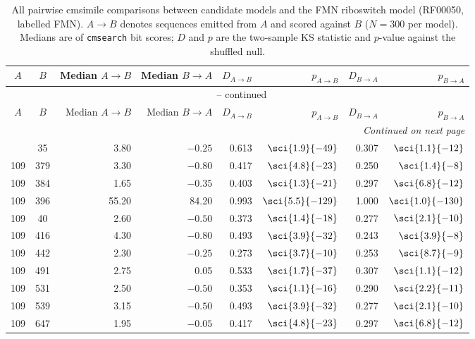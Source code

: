\begingroup
\footnotesize
\setlength{\tabcolsep}{4pt}
\begin{longtable}{ccrrrrrr}
\caption[All pairwise cmsimile comparisons]{All pairwise cmsimile comparisons between candidate models and the FMN riboswitch model (RF00050, labelled FMN). $A \rightarrow B$ denotes sequences emitted from $A$ and scored against $B$ ($N = 300$ per model). Medians are of \texttt{cmsearch} bit scores; $D$ and $p$ are the two-sample KS statistic and $p$-value against the shuffled null.}
\label{tab:cmsimile_appendix} \\
\hline
$A$ & $B$ & Median $A\!\rightarrow\!B$ & Median $B\!\rightarrow\!A$ & $D_{A\rightarrow B}$ & $p_{A\rightarrow B}$ & $D_{B\rightarrow A}$ & $p_{B\rightarrow A}$ \\
\hline
\endfirsthead
\multicolumn{8}{c}{\tablename\ \thetable{} -- continued} \\
\hline
$A$ & $B$ & Median $A\!\rightarrow\!B$ & Median $B\!\rightarrow\!A$ & $D_{A\rightarrow B}$ & $p_{A\rightarrow B}$ & $D_{B\rightarrow A}$ & $p_{B\rightarrow A}$ \\
\hline
\endhead
\hline
\multicolumn{8}{r}{\emph{Continued on next page}} \\
\endfoot
\hline
\endlastfoot
109 & 35  & 3.80 & $-0.25$ & 0.613 & $\sci{1.9}{-49}$ & 0.307 & $\sci{1.1}{-12}$ \\
109 & 379 & 3.30 & $-0.80$ & 0.417 & $\sci{4.8}{-23}$ & 0.250 & $\sci{1.4}{-8}$ \\
109 & 384 & 1.65 & $-0.35$ & 0.403 & $\sci{1.3}{-21}$ & 0.297 & $\sci{6.8}{-12}$ \\
109 & 396 & 55.20 & 84.20 & 0.993 & $\sci{5.5}{-129}$ & 1.000 & $\sci{1.0}{-130}$ \\
109 & 40  & 2.60 & $-0.50$ & 0.373 & $\sci{1.4}{-18}$ & 0.277 & $\sci{2.1}{-10}$ \\
109 & 416 & 4.30 & $-0.80$ & 0.493 & $\sci{3.9}{-32}$ & 0.243 & $\sci{3.9}{-8}$ \\
109 & 442 & 2.30 & $-0.25$ & 0.273 & $\sci{3.7}{-10}$ & 0.253 & $\sci{8.7}{-9}$ \\
109 & 491 & 2.75 & 0.05 & 0.533 & $\sci{1.7}{-37}$ & 0.307 & $\sci{1.1}{-12}$ \\
109 & 531 & 2.50 & $-0.50$ & 0.353 & $\sci{1.1}{-16}$ & 0.290 & $\sci{2.2}{-11}$ \\
109 & 539 & 3.15 & $-0.50$ & 0.493 & $\sci{3.9}{-32}$ & 0.277 & $\sci{2.1}{-10}$ \\
109 & 647 & 1.95 & $-0.05$ & 0.417 & $\sci{4.8}{-23}$ & 0.297 & $\sci{6.8}{-12}$ \\

\end{longtable}
